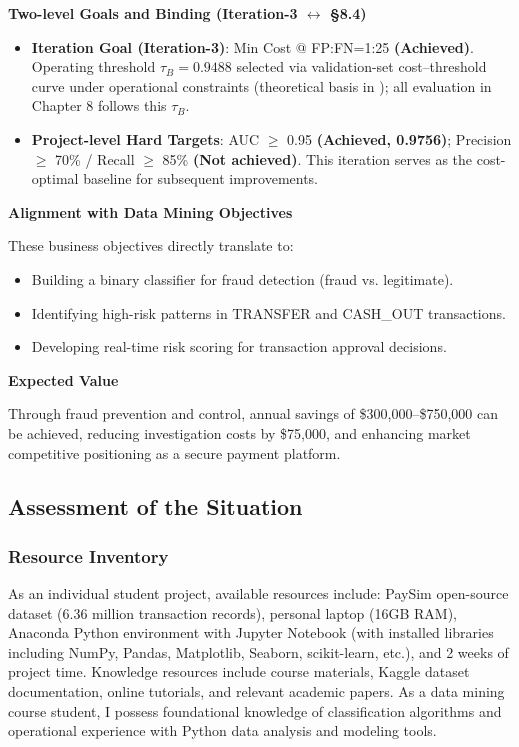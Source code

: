 \documentclass[sigplan,screen]{acmart}
\begin{document}
\textbf{Two-level Goals and Binding (Iteration-3 $\leftrightarrow$ \S8.4)}\newline
\begin{itemize}
\item \textbf{Iteration Goal (Iteration-3)}: Min Cost @ FP:FN=1:25 \textbf{(Achieved)}. Operating threshold $\tau_B{=}0.9488$ selected via validation-set cost--threshold curve under operational constraints (theoretical basis in \citealp{elkan2001foundations}); all evaluation in Chapter 8 follows this $\tau_B$.
\item \textbf{Project-level Hard Targets}: AUC $\geq$ 0.95 \textbf{(Achieved, 0.9756)}; Precision $\geq$ 70\% / Recall $\geq$ 85\% \textbf{(Not achieved)}. This iteration serves as the cost-optimal baseline for subsequent improvements.
\end{itemize}

\textbf{Alignment with Data Mining Objectives}

These business objectives directly translate to:

\begin{itemize}
\item Building a binary classifier for fraud detection (fraud vs. legitimate).
\item Identifying high-risk patterns in TRANSFER and CASH\_OUT transactions.
\item Developing real-time risk scoring for transaction approval decisions.
\end{itemize}

\textbf{Expected Value}

Through fraud prevention and control, annual savings of \$300,000--\$750,000 can be achieved, reducing investigation costs by \$75,000, and enhancing market competitive positioning as a secure payment platform.

\subsection{Assessment of the Situation}

\subsubsection{Resource Inventory}
As an individual student project, available resources include: PaySim open-source dataset (6.36 million transaction records), personal laptop (16GB RAM), Anaconda Python environment with Jupyter Notebook (with installed libraries including NumPy, Pandas, Matplotlib, Seaborn, scikit-learn, etc.), and 2 weeks of project time. Knowledge resources include course materials, Kaggle dataset documentation, online tutorials, and relevant academic papers. As a data mining course student, I possess foundational knowledge of classification algorithms and operational experience with Python data analysis and modeling tools.
\end{document}

